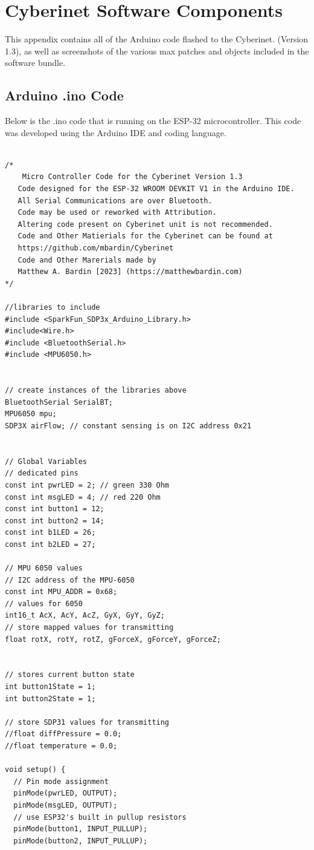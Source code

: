 \chapter{Cyberinet Software Components}
This appendix contains all of the Arduino code flashed to the Cyberinet. (Version 1.3), as well as screenshots of the various max patches and objects included in the software bundle.

\section{Arduino .ino Code}

Below is the .ino code that is running on the ESP-32 microcontroller. This code was developed using the Arduino IDE and coding language.

\begin{verbatim}

/*
    Micro Controller Code for the Cyberinet Version 1.3
   Code designed for the ESP-32 WROOM DEVKIT V1 in the Arduino IDE.
   All Serial Communications are over Bluetooth.
   Code may be used or reworked with Attribution. 
   Altering code present on Cyberinet unit is not recommended.
   Code and Other Matierials for the Cyberinet can be found at 
   https://github.com/mbardin/Cyberinet
   Code and Other Marerials made by 
   Matthew A. Bardin [2023] (https://matthewbardin.com)
*/

//libraries to include
#include <SparkFun_SDP3x_Arduino_Library.h>
#include<Wire.h>
#include <BluetoothSerial.h>
#include <MPU6050.h>


// create instances of the libraries above
BluetoothSerial SerialBT;
MPU6050 mpu;
SDP3X airFlow; // constant sensing is on I2C address 0x21


// Global Variables
// dedicated pins
const int pwrLED = 2; // green 330 Ohm
const int msgLED = 4; // red 220 Ohm
const int button1 = 12;
const int button2 = 14;
const int b1LED = 26;
const int b2LED = 27;

// MPU 6050 values
// I2C address of the MPU-6050
const int MPU_ADDR = 0x68; 
// values for 6050
int16_t AcX, AcY, AcZ, GyX, GyY, GyZ; 
// store mapped values for transmitting
float rotX, rotY, rotZ, gForceX, gForceY, gForceZ;


// stores current button state
int button1State = 1;
int button2State = 1;

// store SDP31 values for transmitting
//float diffPressure = 0.0;
//float temperature = 0.0;

void setup() {
  // Pin mode assignment
  pinMode(pwrLED, OUTPUT);
  pinMode(msgLED, OUTPUT);
  // use ESP32's built in pullup resistors
  pinMode(button1, INPUT_PULLUP); 
  pinMode(button2, INPUT_PULLUP);


\end{verbatim}
